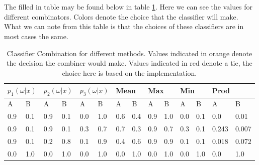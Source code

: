 \documentclass[11pt]{article}
\begin{document}
\section{}
The filled in table may be found below in table \ref{table:a}. Here we can see the values for different combinators.  Colors denote the choice that the classifier will make. What we can note from this table is that the choices of these classifiers are in most cases the same. 
\begin{table}[H]
	\centering
	\centering
	\begin{tabular}{ll|ll|ll|ll|ll|ll|ll}
		\multicolumn{2}{l}{$p_1(\omega|x)$} & \multicolumn{2}{l|}{$p_2(\omega|x)$} & \multicolumn{2}{l|}{$p_3(\omega|x)$} & \multicolumn{2}{l|}{Mean}                                 & \multicolumn{2}{l|}{Max}                                  & \multicolumn{2}{l|}{Min}                                  & \multicolumn{2}{l|}{Prod}                                     \\ \hline
		A                & B                & A                 & B                & A                 & B                & A                           & B                           & A                           & B                           & A                           & B                           & A                             & B                             \\ \hline
		0.9              & 0.1              & 0.9               & 0.1              & 0.0               & 1.0              & \cellcolor[HTML]{F8A102}0.6 & 0.4                         & 0.9                         & \cellcolor[HTML]{F8A102}1.0 & 0.0                         & \cellcolor[HTML]{F8A102}0.1 & 0.0                           & \cellcolor[HTML]{F8A102}0.01  \\
		0.9              & 0.1              & 0.9               & 0.1              & 0.3               & 0.7              & \cellcolor[HTML]{F8A102}0.7 & 0.3                         & \cellcolor[HTML]{F8A102}0.9 & 0.7                         & \cellcolor[HTML]{F8A102}0.3 & 0.1                         & \cellcolor[HTML]{F8A102}0.243 & 0.007                         \\
		0.9              & 0.1              & 0.2               & 0.8              & 0.1               & 0.9              & 0.4                         & \cellcolor[HTML]{F8A102}0.6 & \cellcolor[HTML]{FD6864}0.9 & \cellcolor[HTML]{FD6864}0.9 & \cellcolor[HTML]{FD6864}0.1 & \cellcolor[HTML]{FD6864}0.1 & 0.018                         & \cellcolor[HTML]{F8A102}0.072 \\
		0.0              & 1.0              & 0.0               & 1.0              & 0.0               & 1.0              & 0.0                         & \cellcolor[HTML]{F8A102}1.0 & 0.0                         & \cellcolor[HTML]{F8A102}1.0 & 0.0                         & \cellcolor[HTML]{F8A102}1.0 & 0.0                           & \cellcolor[HTML]{F8A102}1.0  
	\end{tabular}
	\caption{Classifier Combination for different methods. Values indicated in orange denote the decision the combiner would make. Values indicated in red denote a tie, the choice here is based on the implementation.}
	\label{table:a}
\end{table}
\end{document}
